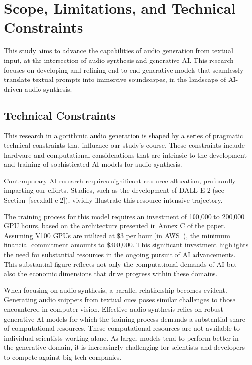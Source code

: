 \section{Scope, Limitations, and Technical Constraints} \label{sec:limitations}

This study aims to advance the capabilities of audio generation from textual input, at the intersection of audio synthesis and generative \ac{AI}. This research focuses on developing and refining end-to-end generative models that seamlessly translate textual prompts into immersive soundscapes, in the landscape of \ac{AI}-driven audio synthesis.

\subsection{Technical Constraints}

This research in algorithmic audio generation is shaped by a series of pragmatic technical constraints that influence our study's course. These constraints include hardware and computational considerations that are intrinsic to the development and training of sophisticated AI models for audio synthesis.

Contemporary AI research requires significant resource allocation, profoundly impacting our efforts. Studies, such as the development of DALL-E 2 (see Section~\ref{sec:dall-e-2}), vividly illustrate this resource-intensive trajectory.

The training process for this model requires an investment of 100,000 to 200,000 GPU hours, based on the architecture presented in Annex C of the paper. Assuming V100 GPUs are utilized at \$3 per hour (in AWS~\cite{amazon_web_services_inc_amazon_nodate}), the minimum financial commitment amounts to \$300,000. This significant investment highlights the need for substantial resources in the ongoing pursuit of AI advancements. This substantial figure reflects not only the computational demands of AI but also the economic dimensions that drive progress within these domains.

When focusing on audio synthesis, a parallel relationship becomes evident. Generating audio snippets from textual cues poses similar challenges to those encountered in computer vision. Effective audio synthesis relies on robust generative \ac{AI} models for which the training process demands a substantial share of computational resources. These computational resources are not available to individual scientists working alone. As larger models tend to perform better in the generative domain, it is increasingly challenging for scientists and developers to compete against big tech companies.

